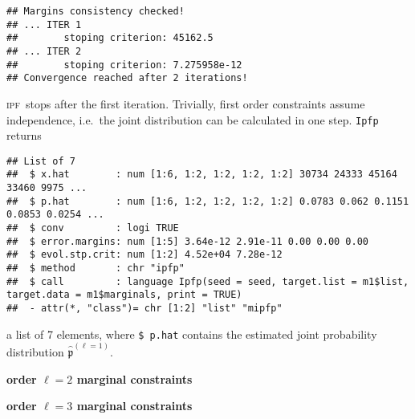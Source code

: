 \documentclass[
]{article}
\newenvironment{Shaded}{\begin{snugshade}}{\end{snugshade}}
\newcommand{\AttributeTok}[1]{\textcolor[rgb]{0.77,0.63,0.00}{#1}}
\newcommand{\DecValTok}[1]{\textcolor[rgb]{0.00,0.00,0.81}{#1}}
\newcommand{\FunctionTok}[1]{\textcolor[rgb]{0.00,0.00,0.00}{#1}}
\newcommand{\NormalTok}[1]{#1}
\newcommand{\OtherTok}[1]{\textcolor[rgb]{0.56,0.35,0.01}{#1}}
\newcommand{\SpecialCharTok}[1]{\textcolor[rgb]{0.00,0.00,0.00}{#1}}
\newcommand{\prob}[1]{\mathfrak{#1}}
\newcommand{\maxentP}{\hat{\prob p}}
\newcommand{\ipf}{\textsc{ipf}~}
\begin{document}
\begin{verbatim}
## Margins consistency checked!
## ... ITER 1 
##        stoping criterion: 45162.5 
## ... ITER 2 
##        stoping criterion: 7.275958e-12 
## Convergence reached after 2 iterations!
\end{verbatim}

\ipf stops after the first iteration. Trivially, first order constraints
assume independence, i.e.~the joint distribution can be calculated in
one step. \texttt{Ipfp} returns

\begin{verbatim}
## List of 7
##  $ x.hat        : num [1:6, 1:2, 1:2, 1:2, 1:2] 30734 24333 45164 33460 9975 ...
##  $ p.hat        : num [1:6, 1:2, 1:2, 1:2, 1:2] 0.0783 0.062 0.1151 0.0853 0.0254 ...
##  $ conv         : logi TRUE
##  $ error.margins: num [1:5] 3.64e-12 2.91e-11 0.00 0.00 0.00
##  $ evol.stp.crit: num [1:2] 4.52e+04 7.28e-12
##  $ method       : chr "ipfp"
##  $ call         : language Ipfp(seed = seed, target.list = m1$list, target.data = m1$marginals, print = TRUE)
##  - attr(*, "class")= chr [1:2] "list" "mipfp"
\end{verbatim}

a list of 7 elements, where \texttt{\$\ p.hat} contains the estimated
joint probability distribution \(\maxentP^{(\ell = 1)}\).

\textbf{order \(\ell = 2\) marginal constraints}

\begin{Shaded}
\end{Shaded}

\textbf{order \(\ell = 3\) marginal constraints}

\begin{Shaded}
\end{Shaded}
\end{document}
